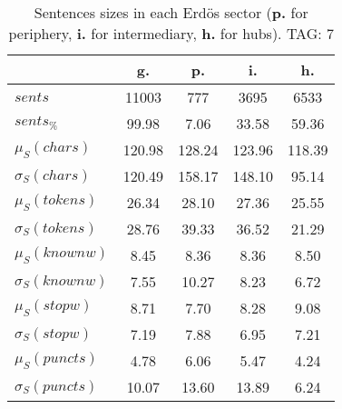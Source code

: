 \begin{table}[h!]
\begin{center}
\begin{tabular}{| l || c | c | c | c |}\hline
 & {\bf g.} & {\bf p.} & {\bf i.} & {\bf h.} \\\hline\hline
$sents$ & 11003  & 777  & 3695  & 6533 \\
$sents_{\%}$ & 99.98  & 7.06  & 33.58  & 59.36 \\\hline
$\mu_S(chars)$ & 120.98  & 128.24  & 123.96  & 118.39 \\
$\sigma_S(chars)$ & 120.49  & 158.17  & 148.10  & 95.14 \\\hline
$\mu_S(tokens)$ & 26.34  & 28.10  & 27.36  & 25.55 \\
$\sigma_S(tokens)$ & 28.76  & 39.33  & 36.52  & 21.29 \\\hline
$\mu_S(knownw)$ & 8.45  & 8.36  & 8.36  & 8.50 \\
$\sigma_S(knownw)$ & 7.55  & 10.27  & 8.23  & 6.72 \\\hline
$\mu_S(stopw)$ & 8.71  & 7.70  & 8.28  & 9.08 \\
$\sigma_S(stopw)$ & 7.19  & 7.88  & 6.95  & 7.21 \\\hline
$\mu_S(puncts)$ & 4.78  & 6.06  & 5.47  & 4.24 \\
$\sigma_S(puncts)$ & 10.07  & 13.60  & 13.89  & 6.24 \\\hline
\end{tabular}
\caption{Sentences sizes in each Erd\"os sector ({{\bf p.}} for periphery, {{\bf i.}} for intermediary, {{\bf h.}} for hubs). TAG: 7}
\end{center}
\end{table}